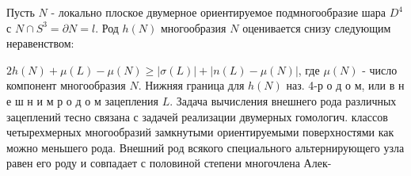 \documentclass[10pt]{article}
\begin{document}
Пусть $N$ - локально плоское двумерное ориентируемое подмногообразие шара $D^{4}$ с $N \cap S^{3}=\partial N=l$. Род $h(N)$ многообразия $N$ оценивается снизу следующим неравенством:



$2 h(N)+\mu(L)-\mu(N) \geqslant|\sigma(L)|+|n(L)-\mu(N)|$, где $\mu(N)$ - число компонент многообразия $N$. Нижняя граница для $h(N)$ наз. 4-р о д о м, или в н е ш н и м р о д о м зацепления $L$. Задача вычисления внешнего рода различных зацеплений тесно связана с задачей реализации двумерных гомологич. классов четырехмерных многообразий замкнутыми ориентируемыми поверхностями как можно меньшего рода. Внешний род всякого специального альтернирующего узла равен его роду и совпадает с половиной степени многочлена Алек-
\end{document}
